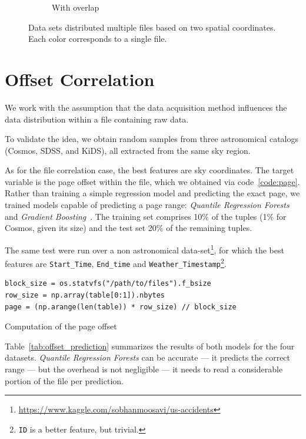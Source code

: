 \begin{figure}[htbp]
\begin{subfigure}[]{0.5\textwidth}
    \caption{With overlap}\label{subfig:mer_multifile}
    \end{subfigure}
    \caption[Data sets distributed multiple files based on two spatial coordinates.]{
        Data sets distributed multiple files based on two spatial coordinates.
        Each color corresponds to a single file.
    }
    \label{fig:tree_cat_cut}
\end{figure}


\section{Offset Correlation}
\label{sec:offset_correlation}

We work with the assumption that the data acquisition method influences
the data distribution within a file containing raw data.

To validate the idea, we obtain random samples from three astronomical catalogs
(\gls{Cosmos}\cite{laigle2016cosmos2015}, \gls{SDSS}\cite{SDSS14}, and \gls{KiDS}\cite{de2013kilo}),
all extracted from the same sky region.

As for the file correlation case, the best features are sky coordinates.
The target variable is the page offset within the file, which we obtained via code~\ref{code:page}.
Rather than training a simple regression model and predicting the exact page, we trained models
capable of predicting a page range: \textit{Quantile Regression Forests}~\cite{meinshausen2006}
and \textit{Gradient Boosting}~\cite{mason2000}.
The training set comprises 10\% of the tuples (1\% for Cosmos, given its size) and the test
set 20\% of the remaining tuples.

The same test were run over a non astronomical data-set\footnote{\url{https://www.kaggle.com/sobhanmoosavi/us-accidents}}, for which
the best features are \texttt{Start\_Time}, \texttt{End\_time} and
\texttt{Weather\_Timestamp}\footnote{\texttt{ID} is a better feature, but trivial.}.

\begin{listing}[htpb]
\begin{verbatim}
block_size = os.statvfs("/path/to/files").f_bsize
row_size = np.array(table[0:1]).nbytes
page = (np.arange(len(table)) * row_size) // block_size
\end{verbatim}
\caption{Computation of the page offset}
\label{code:page}
\end{listing}

Table~\ref{tab:offset_prediction} summarizes the results of both models
for the four datasets. \textit{Quantile Regression Forests} can be accurate --- it predicts
the correct range --- but the overhead is not negligible --- it needs to read
a considerable portion of the file per prediction.


